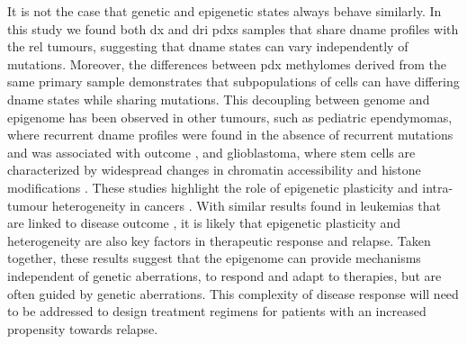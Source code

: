 It is not the case that genetic and epigenetic states always behave similarly.
In this study we found both \gls{dx} and \gls{dri} \glspl{pdx} samples that share \gls{dname} profiles with the \gls{rel} tumours, suggesting that \gls{dname} states can vary independently of mutations.
Moreover, the differences between \gls{pdx} methylomes derived from the same primary sample demonstrates that subpopulations of cells can have differing \gls{dname} states while sharing mutations.
This decoupling between genome and epigenome has been observed in other tumours, such as pediatric ependymomas, where recurrent \gls{dname} profiles were found in the absence of recurrent mutations and was associated with outcome \cite{mackEpigenomicAlterationsDefine2014,pajtlerMolecularClassificationEpendymal2015}, and glioblastoma, where stem cells are characterized by widespread changes in chromatin accessibility \cite{guilhamonSinglecellChromatinAccessibility2021} and histone modifications \cite{liauAdaptiveChromatinRemodeling2017}.
These studies highlight the role of epigenetic plasticity and intra-tumour heterogeneity in cancers \cite{flavahanEpigeneticPlasticityHallmarks2017}.
With similar results found in leukemias that are linked to disease outcome \cite{pastoreCorruptedCoordinationEpigenetic2019,landauLocallyDisorderedMethylation2014,gaitiEpigeneticEvolutionLineage2019,namIntegratingGeneticNongenetic2021,liDistinctEvolutionDynamics2016}, it is likely that epigenetic plasticity and heterogeneity are also key factors in therapeutic response and relapse.
Taken together, these results suggest that the epigenome can provide mechanisms independent of genetic aberrations, to respond and adapt to therapies, but are often guided by genetic aberrations.
This complexity of disease response will need to be addressed to design treatment regimens for patients with an increased propensity towards relapse.

